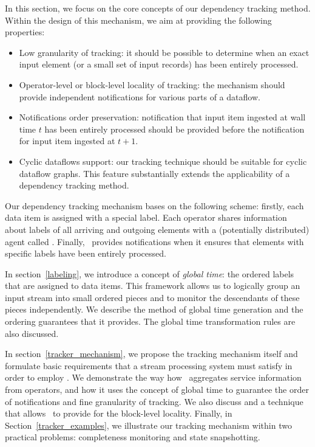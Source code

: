 \label{fs-acker-design}

In this section, we focus on the core concepts of our dependency tracking method. Within the design of this mechanism, we aim at providing the following properties:
\begin{itemize}
    \item Low granularity of tracking: it should be possible to determine when an exact input element (or a small set of input records) has been entirely processed.
    \item Operator-level or block-level locality of tracking: the mechanism should provide independent notifications for various parts of a dataflow.
    \item Notifications order preservation: notification that input item ingested at wall time $t$ has been entirely processed should be provided before the notification for input item ingested at $t+1$.
    \item Cyclic dataflows support: our tracking technique should be suitable for cyclic dataflow graphs. This feature substantially extends the applicability of a dependency tracking method.
\end{itemize}

Our dependency tracking mechanism bases on the following scheme: firstly, each data item is assigned with a special label. Each operator shares information about labels of all arriving and outgoing elements with a (potentially distributed) agent called {\em \tracker}. Finally, \tracker\ provides notifications when it ensures that elements with specific labels have been entirely processed.

In section~\ref{labeling}, we introduce a concept of {\em global time}: the ordered labels that are assigned to data items. This framework allows us to logically group an input stream into small ordered pieces and to monitor the descendants of these pieces independently. We describe the method of global time generation and the ordering guarantees that it provides. The global time transformation rules are also discussed.

In section~\ref{tracker_mechanism}, we propose the tracking mechanism itself and formulate basic requirements that a stream processing system must satisfy in order to employ \tracker . We demonstrate the way how \tracker\ aggregates service information from operators, and how it uses the concept of global time to guarantee the order of notifications and fine granularity of tracking. We also discuss and a technique that allows \tracker\ to provide for the block-level locality. Finally, in Section~\ref{tracker_examples}, we illustrate our tracking mechanism within two practical problems: completeness monitoring and state snapshotting.

